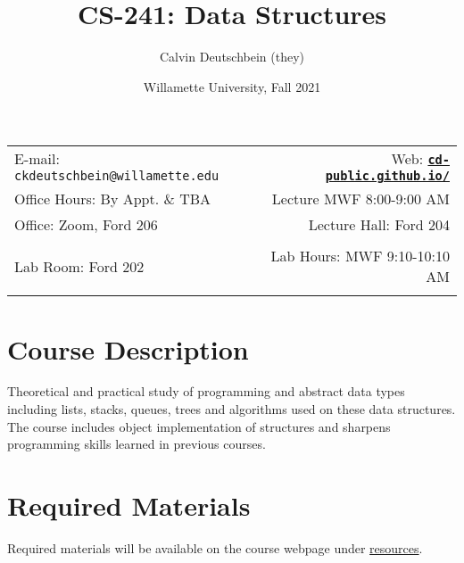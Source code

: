 \documentclass[11pt]{article}
\title{CS-241: Data Structures}
\author{Calvin Deutschbein (they)}
\date{Willamette University, Fall 2021}
\newcommand{\blankline}{\quad\pagebreak[2]}
\begin{document}
\maketitle

\blankline

\begin{tabular*}{.93\textwidth}{@{\extracolsep{\fill}}lr}


E-mail: \texttt{ckdeutschbein@willamette.edu} & Web: \href{https://cd-public.github.io/courses/data_structures/241f21.html}{\tt\bf cd-public.github.io/}  \\

 Office Hours: By Appt. \& TBA  &  Lecture MWF 8:00-9:00 AM \\

 Office: Zoom, Ford 206 & Lecture Hall: Ford 204 \\
 & \\
Lab Room: Ford 202 & Lab Hours: MWF 9:10-10:10 AM \\
&  \\
\hline
\end{tabular*}

\vspace{5 mm}


\section*{Course Description}

Theoretical and practical study of programming and abstract data types including lists, stacks, queues, trees and algorithms used on these data structures. The course includes object implementation of structures and sharpens programming skills learned in previous courses.


\section*{Required Materials}

Required materials will be available on the course webpage under \href{https://cd-public.github.io/courses/data_structures/r-241f21.html}{resources}.


\end{document}
